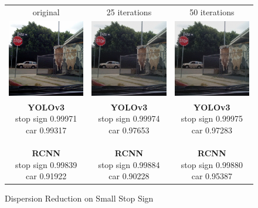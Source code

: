 \documentclass{article}
\begin{document}
\begin{figure}[h]
\centering
    \begin{tabular}{c c c}
        original & 25 iterations & 50 iterations \\
        \includegraphics[width=0.3\linewidth]{../test_images/stop3.png} & \includegraphics[width=0.3\linewidth]{../test_images/dispersion_reduced/stop3_25.png} & \includegraphics[width=0.3\linewidth]{../test_images/dispersion_reduced/stop3_50.png} \\

        \makecell[t]{\textbf{YOLOv3} \\ stop sign 0.99971 \\ car 0.99317 \\ \\ \textbf{RCNN} \\ stop sign 0.99839 \\ car 0.91922 \\} & \makecell[t]{\textbf{YOLOv3} \\ stop sign 0.99974 \\ car 0.97653 \\ \\ \textbf{RCNN} \\ stop sign 0.99884 \\ car 0.90228} & \makecell[t]{\textbf{YOLOv3} \\ stop sign 0.99975 \\ car 0.97283 \\ \\ \textbf{RCNN} \\ stop sign 0.99880 \\ car 0.95387}
\end{tabular}
\caption{Dispersion Reduction on Small Stop Sign}
\label{fig:stop3}
\end{figure}
\end{document}
